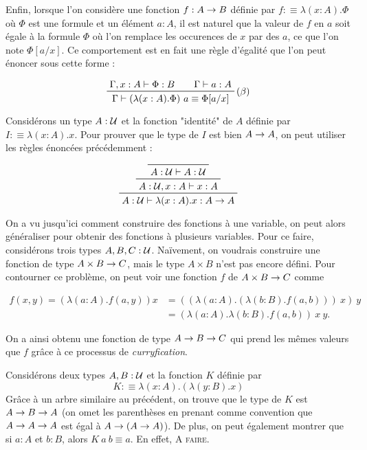 \documentclass[../../rapport.tex]{subfiles}
\begin{document}
  Enfin, lorsque l'on considère une fonction $f : A \rightarrow B$ définie par $f :\equiv \lambda (x : A). \Phi$
  où $\Phi$ est une formule et un élément $a : A$, il est naturel que la valeur de $f$ en $a$ soit égale à
  la formule $\Phi$ où l'on remplace les occurences de $x$ par des $a$, ce que l'on note $\Phi[a/x]$.
  Ce comportement est en fait une règle d'égalité que l'on peut énoncer sous cette forme :

  $$
  \prfinterspace=2em
  \prftree[r]{($\beta$)}{\Gamma, x : A \vdash \Phi : B}{\Gamma \vdash a : A}
    {\Gamma \vdash (\lambda(x : A).\Phi)\ a \equiv \Phi[a/x]}
  $$

  \begin{example}
    Considérons un type $A : \mathcal U$ et la fonction "identité" de $A$ définie par $I :\equiv \lambda(x : A).x$.
    Pour prouver que le type de $I$ est bien $A \rightarrow A$, on peut utiliser les règles énoncées précédemment :

    $$
    \prftree
      {\prftree
	{\prfaxiom{A : \U \vdash A : \U}}
	{A : \U, x : A \vdash x : A}}
      {A : \U \vdash \lambda(x : A). x : A \fun A}
    $$
  \end{example}

  On a vu jusqu'ici comment construire des fonctions à une variable, on peut alors généraliser pour obtenir
  des fonctions à plusieurs variables.
  Pour ce faire, considérons trois types $A, B, C : \mathcal U$.
  Naïvement, on voudrais construire une fonction de type $A \times B \rightarrow C$,
  mais le type $A \times B$ n'est pas encore défini.
  Pour contourner ce problème, on peut voir une fonction $f$ de $A \times B \rightarrow C$ comme

  \begin{align}
    f(x, y) = (\lambda(a : A). f(a, y)) x &= ((\lambda(a : A). (\lambda(b : B). f(a, b)))\ x)\ y \\ 
					  &= (\lambda(a : A).\lambda(b : B). f(a, b))\ x\ y.
  \end{align}

  On a ainsi obtenu une fonction de type $A \rightarrow B \rightarrow C$ qui prend les mêmes valeurs que $f$
  grâce à ce processus de \textit{curryfication}.

  \begin{example}
    Considérons deux types $A, B : \mathcal U$ et la fonction $K$ définie par
    $$K :\equiv \lambda(x : A).(\lambda(y : B).x)$$
    Grâce à un arbre similaire au précédent, on trouve que le type de $K$ est $A \rightarrow B \rightarrow A$
    (on omet les parenthèses en prenant comme convention que $A \rightarrow A \rightarrow A$ est égal à $A \rightarrow (A \rightarrow A)$).
    De plus, on peut également montrer que si $a : A$ et $b : B$, alors $K\ a\ b \equiv a$. En effet, \textsc{A faire.}
  \end{example}
\end{document}
